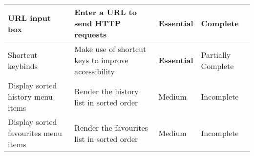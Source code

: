 \documentclass[../Main.tex]{subfiles}
\begin{document}
\begin{center}
\begin{longtable}{|p{3cm}|p{7cm}|l|p{2cm}|}
        \hline
        URL input box & Enter a URL to send HTTP requests & \textbf{Essential} & Complete\\
        \hline
        Shortcut keybinds & Make use of shortcut keys to improve accessibility & \textbf{Essential} & Partially Complete\\
        \hline
        Display sorted history menu items & Render the history list in sorted order & Medium & Incomplete \\
        \hline
        Display sorted favourites menu items & Render the favourites list in sorted order & Medium & Incomplete \\
        \hline
    \end{longtable}

\end{center}
\end{document}
